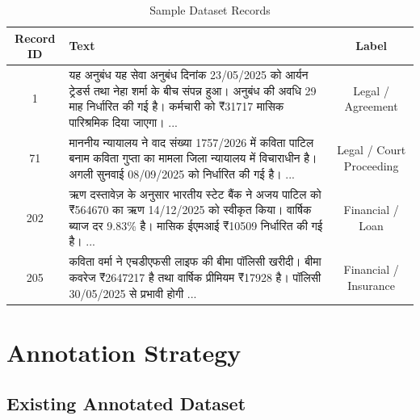 \begin{table}[H]
\centering
\caption{Sample Dataset Records}
\label{tab:samplerecords}

\renewcommand{\arraystretch}{1.4}

\begin{tabular}{|c|p{8cm}|c|}
\hline

Record ID &
Text &
Label
\\

\hline

1 &
यह अनुबंध यह सेवा अनुबंध दिनांक 23/05/2025 को आर्यन ट्रेडर्स तथा नेहा शर्मा के बीच संपन्न हुआ। अनुबंध की अवधि 29 माह निर्धारित की गई है। कर्मचारी को ₹31717 मासिक पारिश्रमिक दिया जाएगा। ...
&
Legal / Agreement
\\

\hline

71 &
माननीय न्यायालय ने वाद संख्या 1757/2026 में कविता पाटिल बनाम कविता गुप्ता का मामला जिला न्यायालय में विचाराधीन है। अगली सुनवाई 08/09/2025 को निर्धारित की गई है। ...
&
Legal / Court Proceeding
\\

\hline

202 &
ऋण दस्तावेज़ के अनुसार भारतीय स्टेट बैंक ने अजय पाटिल को ₹564670 का ऋण 14/12/2025 को स्वीकृत किया। वार्षिक ब्याज दर 9.83\% है। मासिक ईएमआई ₹10509 निर्धारित की गई है। ...
&
Financial / Loan
\\

\hline

205 &
कविता वर्मा ने एचडीएफसी लाइफ की बीमा पॉलिसी खरीदी। बीमा कवरेज ₹2647217 है तथा वार्षिक प्रीमियम ₹17928 है। पॉलिसी 30/05/2025 से प्रभावी होगी ...
&
Financial / Insurance
\\

\hline

\end{tabular}

\end{table}


\section{Annotation Strategy}
\label{sec:annotationstrategy}

\subsection{Existing Annotated Dataset}

